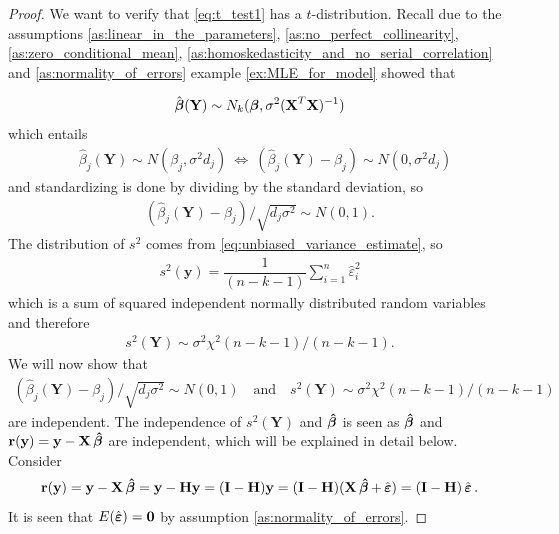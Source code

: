 \begin{proof}
We want to verify that \eqref{eq:t_test1} has a $t$-distribution. Recall due to the assumptions \ref{as:linear_in_the_parameters}, \ref{as:no_perfect_collinearity}, \ref{as:zero_conditional_mean}, \ref{as:homoskedasticity_and_no_serial_correlation} and \ref{as:normality_of_errors} example \ref{ex:MLE_for_model} showed that

\begin{align} \label{eq:th_t_test}
    \hat{\operatorname{\boldsymbol{\beta}}}(\textbf{Y}) \sim N_k(\operatorname{\boldsymbol{\beta}},\sigma^2(\textbf{X}^T\textbf{X})^{-1})
\end{align}
which entails
\begin{align*}
    &\hat{\beta}_j(\textbf{Y})\sim N(\beta_j , \sigma^2d_j) \
    \Leftrightarrow \  (\hat{\beta}_j(\textbf{Y})-\beta_j) \sim N(0,\sigma^2d_j)
\end{align*}
and standardizing is done by dividing by the standard deviation, so
\begin{align*}
    (\hat{\beta}_j(\textbf{Y})-\beta_j)/\sqrt{d_j\sigma^2} \sim N(0,1).
\end{align*}
The distribution of $s^2$ comes from \eqref{eq:unbiased_variance_estimate}, so
\begin{align} \label{eq:sigma_square_of_Y}
    s^2(\textbf{y}) = \dfrac{1}{(n-k-1)}\sum_{i=1}^n \hat{\varepsilon}_i^2
\end{align}
which is a sum of squared independent normally distributed random variables and therefore
\begin{align*}
s^2(\textbf{Y}) \sim \sigma^2 \chi^2(n-k-1)/(n-k-1).    
\end{align*}
We will now show that
\begin{align*}
    (\hat{\beta}_j(\textbf{Y})-\beta_j)/\sqrt{d_j\sigma^2} \sim N(0,1) \quad \text{and} \quad s^2(\textbf{Y}) \sim \sigma^2\chi^2 (n-k-1)/(n-k-1)
\end{align*}
are independent.
The independence of $s^2(\textbf{Y})$ and $\operatorname{\boldsymbol{\hat{\beta}}}$ is seen as $\operatorname{\boldsymbol{\hat{\beta}}}$ and $\textbf{r}(\textbf{y}) = \textbf{y} -\textbf{X} \operatorname{\boldsymbol{\hat{\beta}}}$ are independent, which will be explained in detail below.
Consider
\begin{align*}
    \textbf{r}(\textbf{y}) = \textbf{y}-\textbf{X} \operatorname{\boldsymbol{\hat{\beta}}} = \textbf{y} - \textbf{H} \textbf{y} = (\textbf{I}-\textbf{H})\textbf{y} = (\textbf{I}-\textbf{H}) (\textbf{X} \operatorname{\boldsymbol{\hat{\beta}}} + \operatorname{\hat{\boldsymbol{\varepsilon}}}) = (\textbf{I} - \textbf{H}) \operatorname{\hat{\boldsymbol{\varepsilon}}}.
\end{align*}
It is seen that $E(\operatorname{\hat{\boldsymbol{\varepsilon}}}) = \textbf{0}$ by assumption \ref{as:normality_of_errors}. 

\end{proof}
